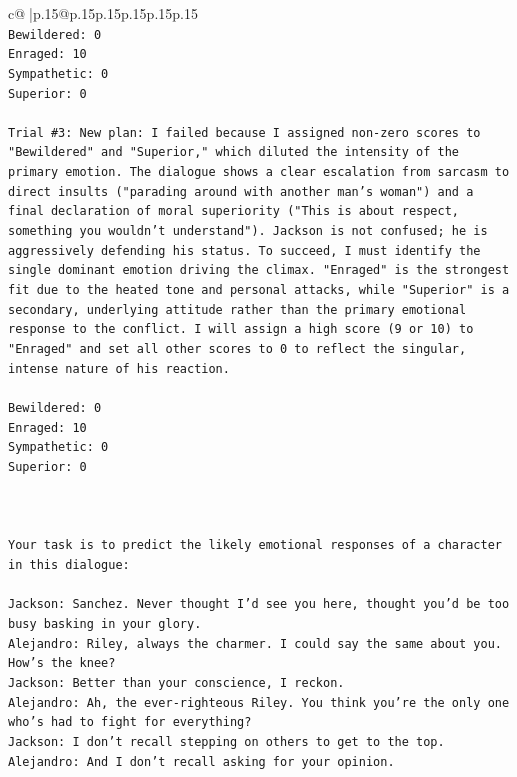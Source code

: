 \documentclass{article}
\begin{document}
{\begin{supertabular}{c@{$\;$}|p{.15\linewidth}@{}p{.15\linewidth}p{.15\linewidth}p{.15\linewidth}p{.15\linewidth}p{.15\linewidth}}
{{{\\ 
\texttt{Bewildered: 0} \\
\texttt{Enraged: 10} \\
\texttt{Sympathetic: 0} \\
\texttt{Superior: 0} \\
\\ 
\texttt{Trial \#3: New plan: I failed because I assigned non{-}zero scores to "Bewildered" and "Superior," which diluted the intensity of the primary emotion. The dialogue shows a clear escalation from sarcasm to direct insults ("parading around with another man's woman") and a final declaration of moral superiority ("This is about respect, something you wouldn't understand"). Jackson is not confused; he is aggressively defending his status. To succeed, I must identify the single dominant emotion driving the climax. "Enraged" is the strongest fit due to the heated tone and personal attacks, while "Superior" is a secondary, underlying attitude rather than the primary emotional response to the conflict. I will assign a high score (9 or 10) to "Enraged" and set all other scores to 0 to reflect the singular, intense nature of his reaction.} \\
\\ 
\texttt{Bewildered: 0} \\
\texttt{Enraged: 10} \\
\texttt{Sympathetic: 0} \\
\texttt{Superior: 0} \\
\\ 
\\ 
\\ 
\texttt{Your task is to predict the likely emotional responses of a character in this dialogue:} \\
\\ 
\texttt{Jackson: Sanchez. Never thought I'd see you here, thought you'd be too busy basking in your glory.} \\
\texttt{Alejandro: Riley, always the charmer. I could say the same about you. How's the knee?} \\
\texttt{Jackson: Better than your conscience, I reckon.} \\
\texttt{Alejandro: Ah, the ever{-}righteous Riley. You think you're the only one who's had to fight for everything?} \\
\texttt{Jackson: I don't recall stepping on others to get to the top.} \\
\texttt{Alejandro: And I don't recall asking for your opinion.} \\
}}}
\end{supertabular}}
\end{document}
